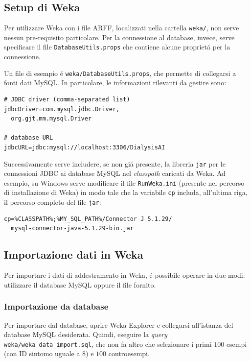 \documentclass[preprint]{acm_proc_article-sp}
\begin{document}
\subsection{Setup di Weka}
\label{appendix-weka-setup}
Per utilizzare Weka con i file ARFF, localizzati nella cartella \verb|weka/|, non serve nessun pre-requisito particolare. Per la connessione al database, invece, serve specificare il file \verb|DatabaseUtils.props| che contiene alcune propriet\'a per la connessione.

Un file di esempio \'e \verb|weka/DatabaseUtils.props|, che permette di collegarsi a fonti dati MySQL. In particolare, le informazioni rilevanti da gestire sono:
\begin{verbatim}
# JDBC driver (comma-separated list)
jdbcDriver=com.mysql.jdbc.Driver,
  org.gjt.mm.mysql.Driver

# database URL
jdbcURL=jdbc:mysql://localhost:3306/DialysisAI
\end{verbatim}

Successivamente serve includere, se non gi\'a presente, la libreria \verb|jar| per le connessioni JDBC ai database MySQL nel \textit{classpath} caricati da Weka.
Ad esempio, su Windows serve modificare il file \verb|RunWeka.ini| (presente nel percorso di installazione di Weka) in modo tale che la variabile \verb|cp| includa, all'ultima riga, il percorso completo del file \verb|jar|:
\begin{verbatim}
cp=%CLASSPATH%;%MY_SQL_PATH%/Connector J 5.1.29/
  mysql-connector-java-5.1.29-bin.jar
\end{verbatim}

\subsection{Importazione dati in Weka}
\label{appendix-weka-import}
Per importare i dati di addestramento in Weka, \'e possibile operare in due modi: utilizzare il database MySQL oppure il file fornito.

\subsubsection{Importazione da database}
\label{appendix-weka-import-db}
Per importare dal database, aprire Weka Explorer e collegarsi all'istanza del database MySQL desiderata.
Quindi, eseguire la \textit{query} \verb|weka/weka_data_import.sql|, che non fa altro che selezionare i primi $100$ esempi (con ID sintomo uguale a $8$) e $100$ controesempi.
\end{document}
